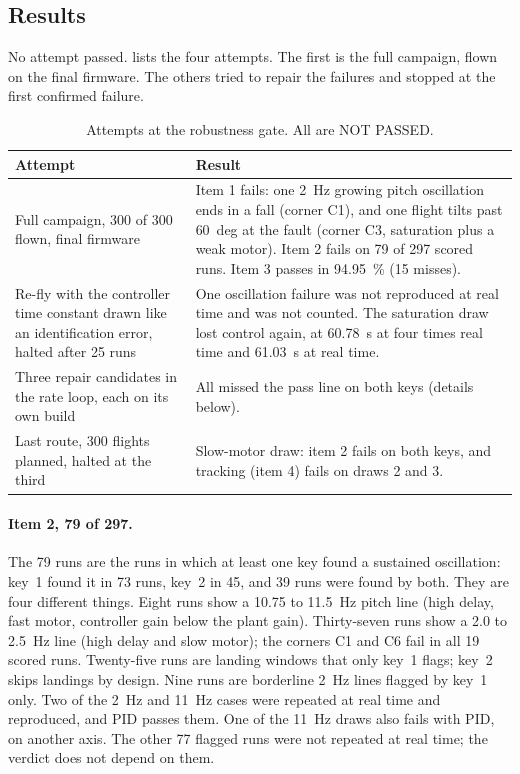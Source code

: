 \subsection{Results}

No attempt passed.
 lists the four attempts.
The first is the full campaign, flown on the final firmware.
The others tried to repair the failures and stopped at the first confirmed failure.

\begin{table}[tbp]
\caption{Attempts at the robustness gate. All are NOT PASSED.}\label{tab:val_g3}
\centering
\small
\begin{tabularx}{\textwidth}{@{}L{3.2cm} Y@{}}
\toprule
Attempt & Result \\
\midrule
Full campaign, 300 of 300 flown, final firmware &
  Item 1 fails: one 2~Hz growing pitch oscillation ends in a fall (corner C1), and one flight tilts past 60~deg at the fault (corner C3, saturation plus a weak motor). Item 2 fails on 79 of 297 scored runs. Item 3 passes in 94.95~\% (15 misses). \\
Re-fly with the controller time constant drawn like an identification error, halted after 25 runs &
  One oscillation failure was not reproduced at real time and was not counted. The saturation draw lost control again, at 60.78~s at four times real time and 61.03~s at real time. \\
Three repair candidates in the rate loop, each on its own build &
  All missed the pass line on both keys (details below). \\
Last route, 300 flights planned, halted at the third &
  Slow-motor draw: item 2 fails on both keys, and tracking (item 4) fails on draws 2 and 3. \\
\bottomrule
\end{tabularx}
\end{table}

\paragraph{Item 2, 79 of 297.}
The 79 runs are the runs in which at least one key found a sustained oscillation: key~1 found it in 73 runs, key~2 in 45, and 39 runs were found by both.
They are four different things.
Eight runs show a 10.75 to 11.5~Hz pitch line (high delay, fast motor, controller gain below the plant gain).
Thirty-seven runs show a 2.0 to 2.5~Hz line (high delay and slow motor); the corners C1 and C6 fail in all 19 scored runs.
Twenty-five runs are landing windows that only key~1 flags; key~2 skips landings by design.
Nine runs are borderline 2~Hz lines flagged by key~1 only.
Two of the 2~Hz and 11~Hz cases were repeated at real time and reproduced, and PID passes them.
One of the 11~Hz draws also fails with PID, on another axis.
The other 77 flagged runs were not repeated at real time; the verdict does not depend on them.

